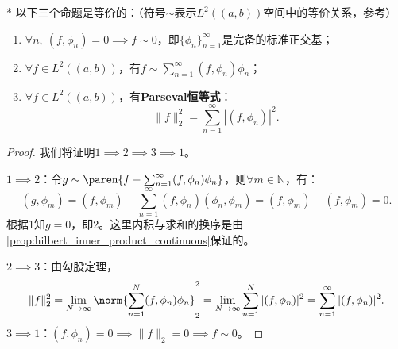 \begin{theorem}*
    以下三个命题是等价的：（符号$\sim$表示$L^2((a,b))$空间中的等价关系，参考）
    \begin{enumerate}
        \item $\forall n,\ (f,\phi_n)=0\implies f\sim 0$，即$\{\phi_n\}_{n=1}^{\infty}$是完备的标准正交基；
        \item $\forall f\in L^2((a,b))$，有$f\sim\sum_{n=1}^{\infty}(f,\phi_n)\phi_n$；
        \item $\forall f\in L^2((a,b))$，有\textbf{Parseval恒等式}：
              \begin{equation}
                  \|f\|_2^2=\sum_{n=1}^{\infty}|(f,\phi_n)|^2.
              \end{equation}
    \end{enumerate}
\end{theorem}
\begin{proof}
    我们将证明$1\implies 2\implies 3\implies 1$。

    $1\implies 2$：令$g\sim \paren{f-\sum_{n=1}^{\infty}(f,\phi_n)\phi_n}$，则$\forall m\in\mathbb{N}$，有：
    \begin{equation}
        (g,\phi_m)=(f,\phi_m)-\sum_{n=1}^{\infty}(f,\phi_n)(\phi_n,\phi_m)=(f,\phi_m)-(f,\phi_m)=0.
    \end{equation}
    根据1知$g=0$，即2。这里内积与求和的换序是由\cref{prop:hilbert_inner_product_continuous}保证的。

    $2\implies 3$：由勾股定理，
    \begin{equation}
        \|f\|_2^2=\lim_{N\to\infty}\norm{\sum_{n=1}^{N}(f,\phi_n)\phi_n}_2^2=\lim_{N\to\infty}\sum_{n=1}^{N}|(f,\phi_n)|^2=\sum_{n=1}^{\infty}|(f,\phi_n)|^2.
    \end{equation}
    $3\implies 1$：$(f,\phi_n)=0\implies\|f\|_2=0\implies f\sim 0$。
\end{proof}
